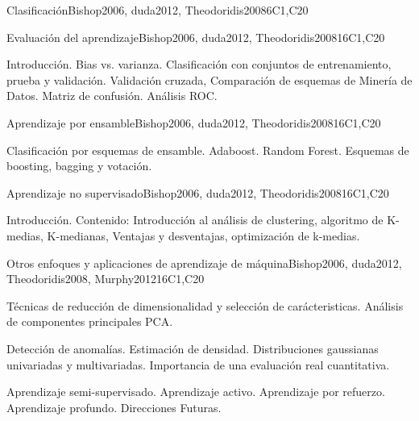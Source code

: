 \begin{syllabus}
\begin{unit}{Clasificación}{}{Bishop2006, duda2012, Theodoridis2008}{6}{C1,C20}
\begin{topics}
\end{topics}

\end{unit}

\begin{unit}{Evaluación del aprendizaje}{}{Bishop2006, duda2012, Theodoridis2008}{16}{C1,C20}
\begin{topics}
      \item Introducción. Bias vs. varianza. Clasificación con conjuntos de entrenamiento, prueba y validación. Validación cruzada, Comparación de esquemas de Minería de Datos. Matriz de confusión. Análisis ROC.
   \end{topics}

\end{unit}

\begin{unit}{Aprendizaje por ensamble}{}{Bishop2006, duda2012, Theodoridis2008}{16}{C1,C20}
\begin{topics}
      \item Clasificación por esquemas de ensamble. Adaboost. Random Forest. Esquemas de boosting, bagging y votación.
   \end{topics}

\end{unit}

\begin{unit}{Aprendizaje no supervisado}{}{Bishop2006, duda2012, Theodoridis2008}{16}{C1,C20}
\begin{topics}
      \item Introducción. Contenido: Introducción al análisis de clustering, algoritmo de K-medias, K-medianas, Ventajas y desventajas, optimización de k-medias.
   \end{topics}

\end{unit}

\begin{unit}{Otros enfoques y aplicaciones de aprendizaje de máquina}{}{Bishop2006, duda2012, Theodoridis2008, Murphy2012}{16}{C1,C20}
\begin{topics}
      \item Técnicas de reducción de dimensionalidad y selección de carácteristicas. Análisis de componentes principales PCA.
      \item Detección de anomalías. Estimación de densidad. Distribuciones gaussianas univariadas y multivariadas. Importancia de una evaluación real cuantitativa.
      \item Aprendizaje semi-supervisado. Aprendizaje activo. Aprendizaje por refuerzo. Aprendizaje profundo. Direcciones Futuras.
   \end{topics}
\end{unit}



\begin{coursebibliography}
\end{coursebibliography}

\end{syllabus}
